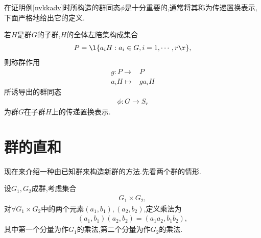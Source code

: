 \begin{remark}
    在证明例\ref{nvkkadv}时所构造的群同态$\phi$是十分重要的,通常将其称为传递置换表示,下面严格地给出它的定义.
\end{remark}
\begin{definition}[传递置换表示]\label{idvhbu}
    若$H$是群$G$的子群,$H$的全体左陪集构成集合\begin{align*}
        P=\l\{a_iH:a_i\in G,i=1,\cdots,r\r\},
    \end{align*}则称群作用\begin{align*}
        g:P\to&P\\
        a_iH\mapsto&ga_iH
    \end{align*}所诱导出的群同态\begin{align*}
        \phi:G\to S_r
    \end{align*}为群$G$在子群$H$上的传递置换表示.
\end{definition}
\section{群的直和}
现在来介绍一种由已知群来构造新群的方法.先看两个群的情形.

设$G_1,G_2$成群,考虑集合\begin{align*}
    G_1\times G_2,
\end{align*}对$\forall G_1\times G_2$中的两个元素$(a_1,b_1),(a_2,b_2)$,定义乘法为\begin{align}
    (a_1,b_1)(a_2,b_2)=(a_1a_2,b_1b_2),\label{asjdkgnfasdm}
\end{align}其中第一个分量为作$G_1$的乘法,第二个分量为作$G_2$的乘法.

